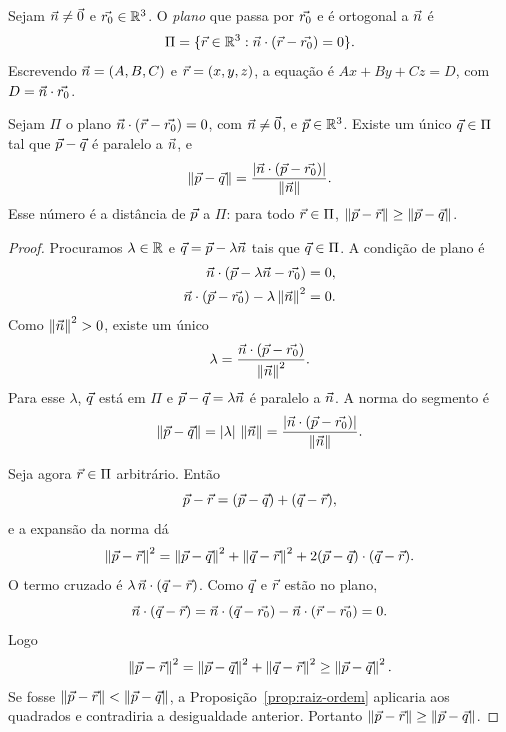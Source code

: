 \documentclass[11pt,a4paper]{article}
\begin{document}
\begin{definicao}
Sejam $\vec{n}\neq\vec{0}$ e $\vec{r_0}\in\mathbb{R}^3$. O \emph{plano} que passa por $\vec{r_0}$ e é ortogonal a $\vec{n}$ é
\[
\Pi=\{\vec{r}\in\mathbb{R}^3:\vec{n}\cdot(\vec{r}-\vec{r_0})=0\}.
\]
Escrevendo $\vec{n}=(A,B,C)$ e $\vec{r}=(x,y,z)$, a equação é $Ax+By+Cz=D$, com $D=\vec{n}\cdot\vec{r_0}$.
\end{definicao}

\begin{teorema}\label{teo:distancia}
Sejam $\Pi$ o plano $\vec{n}\cdot(\vec{r}-\vec{r_0})=0$, com $\vec{n}\neq\vec{0}$, e $\vec{p}\in\mathbb{R}^3$. Existe um único $\vec{q}\in\Pi$ tal que $\vec{p}-\vec{q}$ é paralelo a $\vec{n}$, e
\[
\left\lVert \vec{p}-\vec{q} \right\rVert
=\frac{\left\lvert \vec{n}\cdot(\vec{p}-\vec{r_0}) \right\rvert}{\left\lVert \vec{n} \right\rVert}.
\]
Esse número é a distância de $\vec{p}$ a $\Pi$: para todo $\vec{r}\in\Pi$, $\left\lVert \vec{p}-\vec{r} \right\rVert\ge\left\lVert \vec{p}-\vec{q} \right\rVert$.
\end{teorema}

\begin{proof}
Procuramos $\lambda\in\mathbb{R}$ e $\vec{q}=\vec{p}-\lambda\vec{n}$ tais que $\vec{q}\in\Pi$. A condição de plano é
\begin{align*}
\vec{n}\cdot(\vec{p}-\lambda\vec{n}-\vec{r_0})&=0,\\
\vec{n}\cdot(\vec{p}-\vec{r_0})-\lambda\left\lVert \vec{n} \right\rVert^2&=0.
\end{align*}
Como $\left\lVert \vec{n} \right\rVert^2>0$, existe um único
\[
\lambda=\frac{\vec{n}\cdot(\vec{p}-\vec{r_0})}{\left\lVert \vec{n} \right\rVert^2}.
\]
Para esse $\lambda$, $\vec{q}$ está em $\Pi$ e $\vec{p}-\vec{q}=\lambda\vec{n}$ é paralelo a $\vec{n}$. A norma do segmento é
\[
\left\lVert \vec{p}-\vec{q} \right\rVert=\left\lvert \lambda \right\rvert\,\left\lVert \vec{n} \right\rVert
=\frac{\left\lvert \vec{n}\cdot(\vec{p}-\vec{r_0}) \right\rvert}{\left\lVert \vec{n} \right\rVert}.
\]

Seja agora $\vec{r}\in\Pi$ arbitrário. Então
\[
\vec{p}-\vec{r}=(\vec{p}-\vec{q})+(\vec{q}-\vec{r}),
\]
e a expansão da norma dá
\[
\left\lVert \vec{p}-\vec{r} \right\rVert^2
=\left\lVert \vec{p}-\vec{q} \right\rVert^2+\left\lVert \vec{q}-\vec{r} \right\rVert^2
+2(\vec{p}-\vec{q})\cdot(\vec{q}-\vec{r}).
\]
O termo cruzado é $\lambda\,\vec{n}\cdot(\vec{q}-\vec{r})$. Como $\vec{q}$ e $\vec{r}$ estão no plano,
\[
\vec{n}\cdot(\vec{q}-\vec{r})
=\vec{n}\cdot(\vec{q}-\vec{r_0})-\vec{n}\cdot(\vec{r}-\vec{r_0})=0.
\]
Logo
\[
\left\lVert \vec{p}-\vec{r} \right\rVert^2
=\left\lVert \vec{p}-\vec{q} \right\rVert^2+\left\lVert \vec{q}-\vec{r} \right\rVert^2
\ge\left\lVert \vec{p}-\vec{q} \right\rVert^2.
\]
Se fosse $\left\lVert \vec{p}-\vec{r} \right\rVert<\left\lVert \vec{p}-\vec{q} \right\rVert$, a Proposição~\ref{prop:raiz-ordem} aplicaria aos quadrados e contradiria a desigualdade anterior. Portanto $\left\lVert \vec{p}-\vec{r} \right\rVert\ge\left\lVert \vec{p}-\vec{q} \right\rVert$.
\end{proof}
\end{document}
